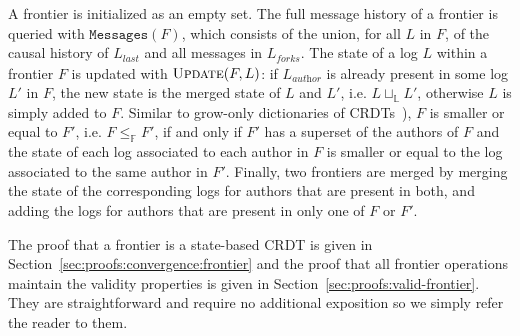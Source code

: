 \documentclass[9pt, oneside]{article}   	%
\begin{document}
A frontier is initialized as an empty set. The full message history of a frontier is queried with $\texttt{Messages}(F)$, which consists of the union, for all $L$ in $F$, of the causal history of $L_\textit{last}$ and all messages in $L_\textit{forks}$. The state of a log $L$ within a frontier $F$ is updated with $\textsc{Update}(F,L)$: if $L_\textit{author}$ is already present in some log $L'$ in $F$, the new state is the merged state of $L$ and $L'$, i.e. $L \sqcup_\mathds{L} L'$, otherwise $L$ is simply added to $F$. Similar to grow-only dictionaries of CRDTs~\cite{lavoie2023inftypset, lavoie2023gocledger}), $F$ is smaller or equal to $F'$, i.e.  $F \leq_\mathds{F} F'$, if and only if $F'$ has a superset of the authors of $F$ and the state of each log associated to each author in $F$ is smaller or equal to the log associated to the same author in $F'$. Finally, two frontiers are merged by merging the state of the corresponding logs for authors that are present in both, and adding the logs for authors that are present in only one of $F$ or $F'$.

The proof that a frontier is a state-based CRDT is given in Section~\ref{sec:proofs:convergence:frontier} and the proof that all frontier operations maintain the validity properties is given in Section~\ref{sec:proofs:valid-frontier}. They are straightforward and require no additional exposition so we simply refer the reader to them.
\end{document}
